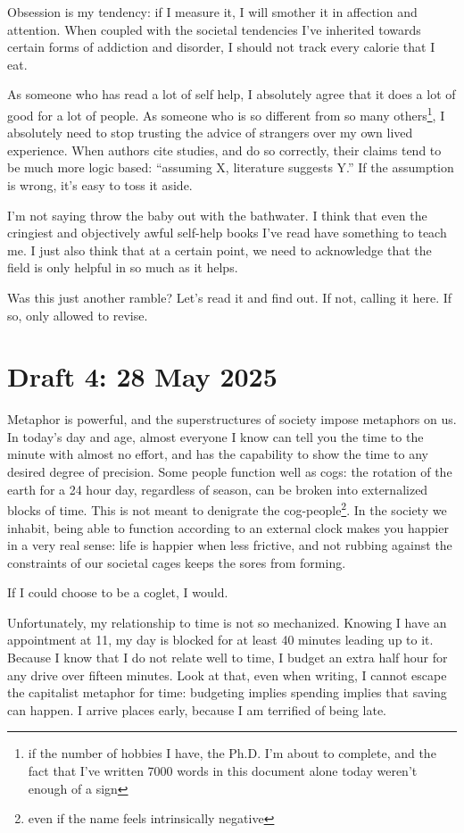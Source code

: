 \documentclass[12pt]{article}
\newcommand{\say}[1]{``#1''}
\renewcommand{\,}{\textsuperscript{,}}
\begin{document}
Obsession is my tendency: if I measure it, I will smother it in affection and attention.  
When coupled with the societal tendencies I've inherited towards certain forms of addiction and disorder, I should not track every calorie that I eat.

As someone who has read a lot of self help, I absolutely agree that it does a lot of good for a lot of people.  
As someone who is so different from so many others\footnote{if the number of hobbies I have, the Ph.D. I'm about to complete, and the fact that I've written 7000 words in this document alone today weren't enough of a sign}, I absolutely need to stop trusting the advice of strangers over my own lived experience.  
When authors cite studies, and do so correctly, their claims tend to be much more logic based: \say{assuming X, literature suggests Y.}  
If the assumption is wrong, it's easy to toss it aside.

I'm not saying throw the baby out with the bathwater.  
I think that even the cringiest and objectively awful self-help books I've read have something to teach me.  
I just also think that at a certain point, we need to acknowledge that the field is only helpful in so much as it helps.

Was this just another ramble? Let's read it and find out. If not, calling it here.  
If so, only allowed to revise.

\section{Draft 4: 28 May 2025}

Metaphor is powerful, and the superstructures of society impose metaphors on us.  
In today's day and age, almost everyone I know can tell you the time to the minute with almost no effort, and has the capability to show the time to any desired degree of precision.  
Some people function well as cogs: the rotation of the earth for a 24 hour day, regardless of season, can be broken into externalized blocks of time.  
This is not meant to denigrate the cog-people\footnote{even if the name feels intrinsically negative}.  
In the society we inhabit, being able to function according to an external clock makes you happier in a very real sense: life is happier when less frictive, and not rubbing against the constraints of our societal cages keeps the sores from forming.

If I could choose to be a coglet, I would.

Unfortunately, my relationship to time is not so mechanized.  
Knowing I have an appointment at 11, my day is blocked for at least 40 minutes leading up to it.  
Because I know that I do not relate well to time, I budget an extra half hour for any drive over fifteen minutes.  
Look at that, even when writing, I cannot escape the capitalist metaphor for time: budgeting implies spending implies that saving can happen.  
I arrive places early, because I am terrified of being late.
\end{document}
